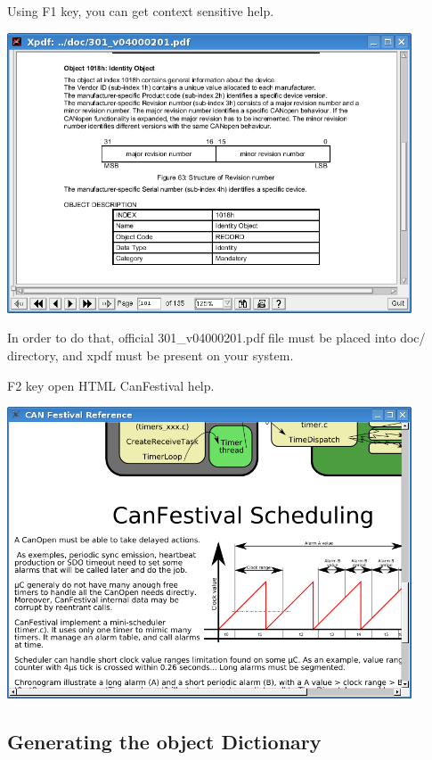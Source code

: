 \documentclass[12pt,english,a4paper]{book}
\begin{document}
Using F1 key, you can get context sensitive help.

\begin{center}
\includegraphics[width=12cm]{Pictures/10000201000002F30000020B23ED7F67} 
\par\end{center}

In order to do that, official 301\_v04000201.pdf file must be placed
into doc/ directory, and xpdf must be present on your system.

F2 key open HTML CanFestival help.

\begin{center}
\includegraphics[width=12cm]{Pictures/10000201000003440000025ACC3FD2F1} 
\par\end{center}


\subsection{Generating the object Dictionary}
\end{document}
